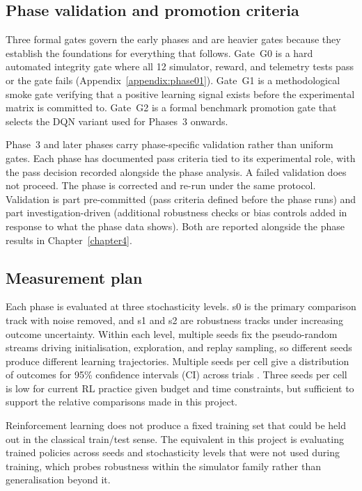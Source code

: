 \subsection{Phase validation and promotion criteria}
\label{sec:promotion-gates}

Three formal gates govern the early phases and are heavier gates because they establish the foundations for everything that follows. Gate~G0 is a hard automated integrity gate where all 12 simulator, reward, and telemetry tests pass or the gate fails (Appendix~\ref{appendix:phase01}). Gate~G1 is a methodological smoke gate verifying that a positive learning signal exists before the experimental matrix is committed to. Gate~G2 is a formal benchmark promotion gate that selects the DQN variant used for Phases~3 onwards.

Phase~3 and later phases carry phase-specific validation rather than uniform gates. Each phase has documented pass criteria tied to its experimental role, with the pass decision recorded alongside the phase analysis. A failed validation does not proceed. The phase is corrected and re-run under the same protocol. Validation is part pre-committed (pass criteria defined before the phase runs) and part investigation-driven (additional robustness checks or bias controls added in response to what the phase data shows). Both are reported alongside the phase results in Chapter~\ref{chapter4}.

\subsection{Measurement plan}
\label{sec:measurement-plan}

Each phase is evaluated at three stochasticity levels. s0 is the primary comparison track with noise removed, and s1 and s2 are robustness tracks under increasing outcome uncertainty. Within each level, multiple seeds fix the pseudo-random streams driving initialisation, exploration, and replay sampling, so different seeds produce different learning trajectories. Multiple seeds per cell give a distribution of outcomes for 95\% confidence intervals (CI) across trials \citep{henderson2018deep}. Three seeds per cell is low for current RL practice given budget and time constraints, but sufficient to support the relative comparisons made in this project.

Reinforcement learning does not produce a fixed training set that could be held out in the classical train/test sense. The equivalent in this project is evaluating trained policies across seeds and stochasticity levels that were not used during training, which probes robustness within the simulator family rather than generalisation beyond it.

